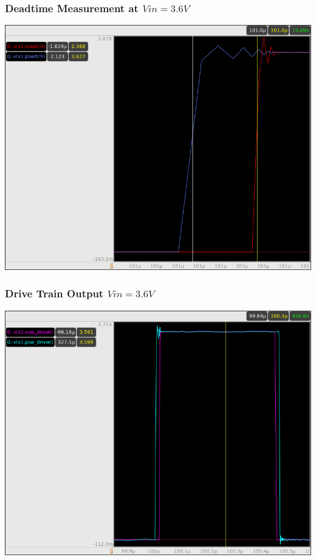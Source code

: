 \documentclass{beamer}
\begin{document}
\begin{frame}
  \frametitle{Deadtime Measurement at $Vin = 3.6V$}
  \includegraphics[scale=0.25]{pwm-deadtime-rise.png}
\end{frame}

\begin{frame}
  \frametitle{Drive Train Output $Vin = 3.6V$}
  \includegraphics[scale=0.25]{drive-train-output.png}
\end{frame}
\end{document}

